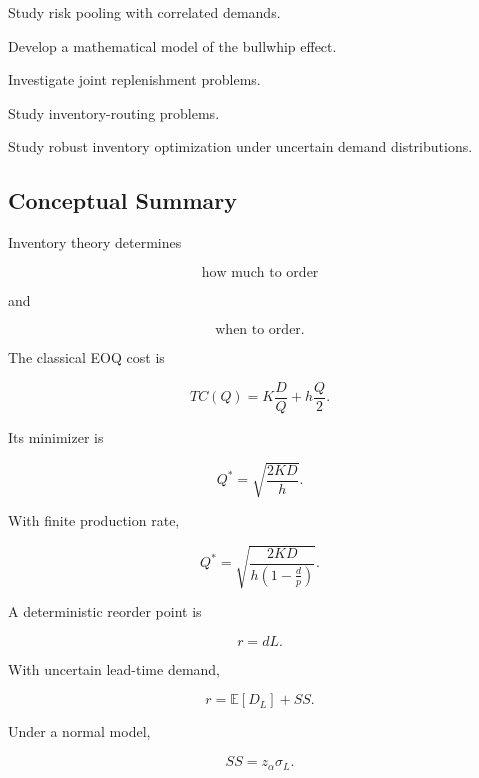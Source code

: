 \begin{exercise}[4]
Study risk pooling with correlated demands.
\end{exercise}

\begin{exercise}[4]
Develop a mathematical model of the bullwhip effect.
\end{exercise}

\begin{exercise}[4]
Investigate joint replenishment problems.
\end{exercise}

\begin{exercise}[4]
Study inventory-routing problems.
\end{exercise}

\begin{exercise}[4]
Study robust inventory optimization under uncertain demand distributions.
\end{exercise}

\subsection{Conceptual Summary}
\label{subsec:inventory-summary}

Inventory theory determines

\[
\boxed{
\text{how much to order}
}
\]

and

\[
\boxed{
\text{when to order}.
}
\]

The classical EOQ cost is

\[
\boxed{
TC(Q)
=
K\frac{D}{Q}
+
h\frac{Q}{2}.
}
\]

Its minimizer is

\[
\boxed{
Q^*
=
\sqrt{
\frac{2KD}{h}
}.
}
\]

With finite production rate,

\[
\boxed{
Q^*
=
\sqrt{
\frac{
2KD
}{
h
\left(
1-\frac{d}{p}
\right)
}
}.
}
\]

A deterministic reorder point is

\[
\boxed{
r=dL.
}
\]

With uncertain lead-time demand,

\[
\boxed{
r
=
\mathbb{E}[D_L]
+
SS.
}
\]

Under a normal model,

\[
\boxed{
SS
=
z_\alpha\sigma_L.
}
\]

